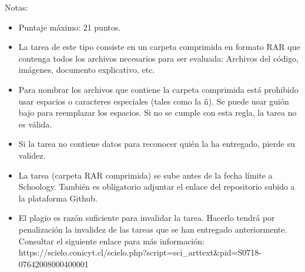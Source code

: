 \documentclass[11pt,article,landscape]{memoir}
\begin{document}
Notas:\\
\begin{itemize}
    \item Puntaje máximo: 21 puntos.
    \item La tarea de este tipo consiste en un carpeta comprimida en formato RAR que contenga todos los archivos necesarios para ser evaluada: Archivos del código, imágenes, documento explicativo, etc.
    \item Para nombrar los archivos que contiene la carpeta comprimida está prohibido usar espacios o caracteres especiales (tales como la ñ). Se puede usar guión bajo para reemplazar los espacios. Si no se cumple con esta regla, la tarea no es válida.
    \item Si la tarea no contiene datos para reconocer quién la ha entregado, pierde su validez.
    \item La tarea (carpeta RAR comprimida) se sube antes de la fecha límite a Schoology. También es obligatorio adjuntar el enlace del repositorio subido a la plataforma Github.
    \item El plagio es razón suficiente para invalidar la tarea. Hacerlo tendrá por penalización la invalidez de las tareas que se han entregado anteriormente. Consultar el siguiente enlace para más información: https://scielo.conicyt.cl/scielo.php?script=sci\_arttext\&pid=S0718-07642008000400001
\end{itemize}
\end{document}
